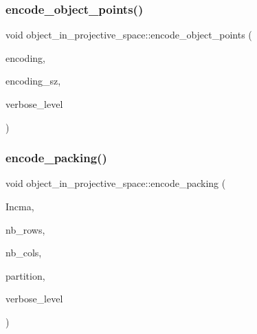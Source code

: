 \subsubsection{\texorpdfstring{encode\+\_\+object\+\_\+points()}{encode\_object\_points()}}
{\footnotesize\ttfamily void object\+\_\+in\+\_\+projective\+\_\+space\+::encode\+\_\+object\+\_\+points (\begin{DoxyParamCaption}\item[{\mbox{\hyperlink{galois_8h_a09fddde158a3a20bd2dcadb609de11dc}{I\+NT}} $\ast$\&}]{encoding,  }\item[{\mbox{\hyperlink{galois_8h_a09fddde158a3a20bd2dcadb609de11dc}{I\+NT}} \&}]{encoding\+\_\+sz,  }\item[{\mbox{\hyperlink{galois_8h_a09fddde158a3a20bd2dcadb609de11dc}{I\+NT}}}]{verbose\+\_\+level }\end{DoxyParamCaption})}

\mbox{\label{classobject__in__projective__space_a510abf71c9db147e0c3a93fa9772d045}} 
\subsubsection{\texorpdfstring{encode\+\_\+packing()}{encode\_packing()}}
{\footnotesize\ttfamily void object\+\_\+in\+\_\+projective\+\_\+space\+::encode\+\_\+packing (\begin{DoxyParamCaption}\item[{\mbox{\hyperlink{galois_8h_a09fddde158a3a20bd2dcadb609de11dc}{I\+NT}} $\ast$\&}]{Incma,  }\item[{\mbox{\hyperlink{galois_8h_a09fddde158a3a20bd2dcadb609de11dc}{I\+NT}} \&}]{nb\+\_\+rows,  }\item[{\mbox{\hyperlink{galois_8h_a09fddde158a3a20bd2dcadb609de11dc}{I\+NT}} \&}]{nb\+\_\+cols,  }\item[{\mbox{\hyperlink{galois_8h_a09fddde158a3a20bd2dcadb609de11dc}{I\+NT}} $\ast$\&}]{partition,  }\item[{\mbox{\hyperlink{galois_8h_a09fddde158a3a20bd2dcadb609de11dc}{I\+NT}}}]{verbose\+\_\+level }\end{DoxyParamCaption})}

\mbox{\label{classobject__in__projective__space_a12c0ee007c02544a291189c306178224}} 
